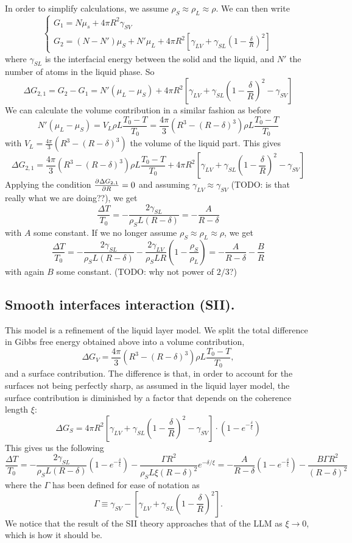 In order to simplify calculations, we assume $\rho_S \approx \rho_L \approx \rho$. We can then write
\[ \begin{cases}
G_1 = N\mu_s + 4\pi R^2 \gamma_{SV} \\
G_2 = (N- N')\mu_S + N'\mu_L + 4\pi R^2 \left[\gamma_{LV}+\gamma_{SL} \left(1- \frac{\delta}{R}\right)^2\right]
\end{cases} \]
where $\gamma_{SL}$ is the interfacial energy between the solid and the liquid, and $N'$ the number of atoms in the liquid phase. So
\[ \Delta G_{2,1} = G_2 - G_1 = N'(\mu_L - \mu_S) + 4\pi R^2 \left[\gamma_{LV}+\gamma_{SL}\left(1- \frac{\delta}{R}\right)^2 - \gamma_{SV}\right] \]
We can calculate the volume contribution in a similar fashion as before
\[ N'(\mu_L - \mu_S) = V_L\rho L \frac{T_0-T}{T_0} = \frac{4\pi}{3}(R^3 - (R-\delta)^3)\rho L \frac{T_0-T}{T_0} \]
with $V_L = \frac{4\pi}{3}(R^3 - (R-\delta)^3)$ the volume of the liquid part. This gives
\[ \Delta G_{2,1} =  \frac{4\pi}{3}(R^3 - (R-\delta)^3)\rho L \frac{T_0-T}{T_0} + 4\pi R^2 \left[\gamma_{LV}+\gamma_{SL}\left(1- \frac{\delta}{R}\right)^2 - \gamma_{SV}\right] \]
Applying the condition $ \frac{\partial{^{}}\Delta G_{2,1}}{\partial{{R}^{}}}  = 0$ and assuming $\gamma_{LV} \approx \gamma_{SV}$ (TODO: is that really what we are doing??), we get
\[ \frac{\Delta T}{T_0} = - \frac{2\gamma_{SL}}{\rho_S L(R-\delta)} = - \frac{A}{R-\delta} \]
with $A$ some constant. If we no longer assume $\rho_S \approx \rho_L \approx \rho$, we get
\[ \frac{\Delta T}{T_0} = - \frac{2\gamma_{SL}}{\rho_S L(R-\delta)} - \frac{2\gamma_{LV}}{\rho_S L R}\left(1- \frac{\rho_S}{\rho_L}\right) = - \frac{A}{R-\delta} - \frac{B}{R} \] with again $B$ some constant. (TODO: why not power of $2/3$?)

\subsection{Smooth interfaces interaction (SII).}
This model is a refinement of the liquid layer model. We split the total difference in Gibbs free energy obtained above into a volume contribution,
\[ \Delta G_V = \frac{4\pi}{3}(R^3 - (R-\delta)^3)\rho L \frac{T_0-T}{T_0}, \]
and a surface contribution. The difference is that, in order to account for the surfaces not being perfectly sharp, as assumed in the liquid layer model, the surface contribution is diminished by a factor that depends on the coherence length $\xi$:
\[ \Delta G_S = 4\pi R^2 \left[\gamma_{LV}+\gamma_{SL}\left(1- \frac{\delta}{R}\right)^2 - \gamma_{SV}\right] \cdot \left(1-e^{- \frac{\delta}{\xi}}\right) \]
This gives us the following
\[ \frac{\Delta T}{T_0} = - \frac{2\gamma_{SL}}{\rho_S L(R-\delta)}\left(1-e^{- \frac{\delta}{\xi}}\right) - \frac{\Gamma R^2}{\rho_S L\xi (R-\delta)^2}e^{-\delta/\xi} = - \frac{A}{R-\delta}\left(1-e^{- \frac{\delta}{\xi}}\right) - \frac{B\Gamma R^2}{(R-\delta)^2} \]
where the $\Gamma$ has been defined for ease of notation as
\[ \Gamma \equiv \gamma_{SV} - \left[\gamma_{LV} + \gamma_{SL}\left(1- \frac{\delta}{R}\right)^2\right]. \]
We notice that the result of the SII theory approaches that of the LLM as $\xi \to 0$, which is how it should be.


